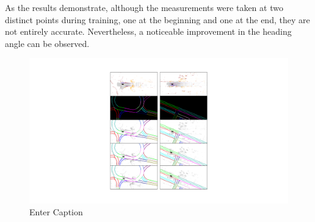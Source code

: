 As the results demonstrate, although the measurements were taken at two distinct points during training, one at the beginning and one at the end, they are not entirely accurate. Nevertheless, a noticeable improvement in the heading angle can be observed. 
\begin{figure}[H]
    \centering
    \includegraphics[width=1\linewidth]{LateX//figs/IMMAGINI_L1_rete.pdf}
    \caption{Enter Caption}
    \label{fig:enter-label}
\end{figure}

